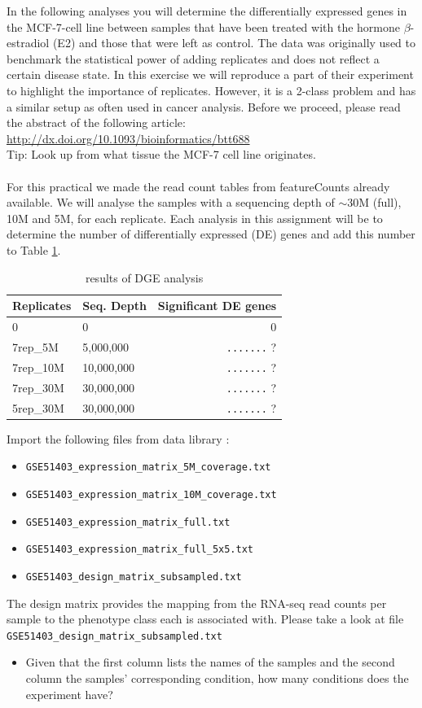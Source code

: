 In the following analyses you will determine the differentially expressed genes in the MCF-7-cell line between samples that have been treated with the hormone $\beta$-estradiol (E2) and those that were left as control.
The data was originally used to benchmark the statistical power of adding replicates and does not reflect a certain disease state.
In this exercise we will reproduce a part of their experiment to highlight the importance of replicates.
However, it is a 2-class problem and has a similar setup as often used in cancer analysis.
Before we proceed, please read the abstract of the following article:
\url{http://dx.doi.org/10.1093/bioinformatics/btt688}\\
Tip: Look up from what tissue the MCF-7 cell line originates.\\
\\
For this practical we made the read count tables from featureCounts already available.
We will analyse the samples with a sequencing depth of $\sim$30M (full), 10M and 5M, for each replicate.
Each analysis in this assignment will be to determine the number of differentially expressed (DE) genes and add this number to Table \ref{tab:dge_ad_01}.
\begin{table}[]
\centering
\caption{results of DGE analysis}
\label{tab:dge_ad_01}
\begin{tabular}{ | l | l | r | }
\hline
Replicates & Seq. Depth & Significant DE genes \\
\hline
0          & 0          & 0\quad\quad \\
7rep\_5M   & 5,000,000  & \verb|.......| ? \\
7rep\_10M  & 10,000,000 & \verb|.......| ? \\
7rep\_30M  & 30,000,000 & \verb|.......| ? \\
5rep\_30M  & 30,000,000 & \verb|.......| ? \\
\hline
\end{tabular}
\end{table}
Import the following files from data library \textit{\datalibrarydirrnaseqadvanced}:
\begin{itemize}
	\item[] \verb|GSE51403_expression_matrix_5M_coverage.txt|
	\item[] \verb|GSE51403_expression_matrix_10M_coverage.txt|
	\item[] \verb|GSE51403_expression_matrix_full.txt|
	\item[] \verb|GSE51403_expression_matrix_full_5x5.txt|
	\item[] \verb|GSE51403_design_matrix_subsampled.txt|
\end{itemize}
The design matrix provides the mapping from the RNA-seq read counts per sample to the phenotype class each is associated with.
Please take a look at file \verb|GSE51403_design_matrix_subsampled.txt|
\begin{itemize}
	\item Given that the first column lists the names of the samples and the second column the samples' corresponding condition, how many conditions does the experiment have?
\end{itemize}
